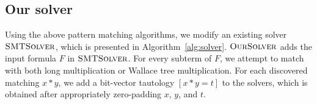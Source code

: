 \subsection{Our solver}


Using the above pattern matching algorithms, we modify an existing
solver $\textsc{SMTSolver}$, which
is presented in Algorithm~\ref{alg:solver}.
%
$\textsc{OurSolver}$ adds the input formula $F$ in $\textsc{SMTSolver}$.
%
For every subterm of $F$, we attempt to match with both long multiplication
or Wallace tree multiplication.
%
For each discovered matching $x*y$, we add a bit-vector tautology $[x*y = t]$ 
to the solvers, which is obtained after
appropriately zero-padding $x$, $y$, and $t$.
%



